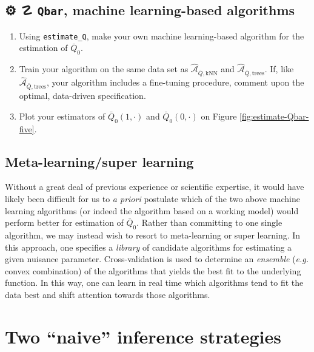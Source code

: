 \documentclass[
  11pt,
  openright,twoside]{book}
\newcommand{\gear}{\usebox{\gearbox}\;}
\DeclareRobustCommand{\stixdanger}{%
  {\usefont{U}{stixbbit}{m}{it}\symbol{"F6}}%
}
\newcommand{\Algo}{\widehat{\mathcal{A}}}
\newcommand{\Qbar}{\bar{Q}}
\theoremstyle{definition}
\theoremstyle{definition}
\theoremstyle{definition}
\theoremstyle{definition}
\theoremstyle{remark}
\begin{document}
\hypertarget{nuisance-Qbar-ml-exo}{%
\section{\texorpdfstring{⚙ \gear ☡ \stixdanger{} \texttt{Qbar}, machine learning-based algorithms}{⚙ ☡  Qbar, machine learning-based algorithms}}\label{nuisance-Qbar-ml-exo}}

\begin{enumerate}
\def\labelenumi{\arabic{enumi}.}
\item
  Using \texttt{estimate\_Q}, make your own machine learning-based algorithm for the
  estimation of \(\Qbar_{0}\).
\item
  Train your algorithm on the same data set as \(\Algo_{\Qbar,\text{kNN}}\) and
  \(\Algo_{\Qbar,\text{trees}}\). If, like \(\Algo_{\Qbar,\text{trees}}\), your
  algorithm includes a fine-tuning procedure, comment upon the optimal,
  data-driven specification.
\item
  Plot your estimators of \(\Qbar_{0}(1,\cdot)\) and \(\Qbar_{0}(0,\cdot)\) on
  Figure \ref{fig:estimate-Qbar-five}.
\end{enumerate}

\hypertarget{meta-learning}{%
\section{Meta-learning/super learning}\label{meta-learning}}

Without a great deal of previous experience or scientific expertise, it would
have likely been difficult for us to \emph{a priori} postulate which of the two
above machine learning algorithms (or indeed the algorithm based on a working
model) would perform better for estimation of \(\bar{Q}_0\). Rather than
committing to one single algorithm, we may instead wish to resort to
meta-learning or super learning. In this approach, one specifies a \emph{library}
of candidate algorithms for estimating a given nuisance parameter.
Cross-validation is used to determine an \emph{ensemble} (\emph{e.g.} convex
combination) of the algorithms that yields the best fit to the underlying
function. In this way, one can learn in real time which algorithms tend to
fit the data best and shift attention towards those algorithms.



\hypertarget{naive-estimators}{%
\chapter{Two ``naive'' inference strategies}\label{naive-estimators}}
\end{document}
